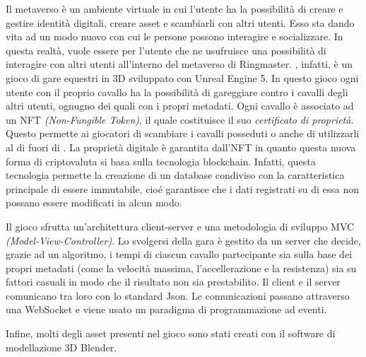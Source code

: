Il metaverso \`e un ambiente virtuale in cui l'utente ha la possibilità di creare e gestire identità digitali, creare asset e scambiarli con altri utenti. Esso sta dando vita ad un modo nuovo con cui le persone possono interagire e socializzare.
%
In questa realtà, \nomeapp{} vuole essere per l'utente che ne usufruisce una possibilità di interagire con altri utenti all'interno del metaverso di Ringmaster.
%
\nomeapp{}, infatti, \`e un gioco di gare equestri in 3D sviluppato con Unreal Engine 5.
%
In questo gioco ogni utente con il proprio cavallo ha la possibilità di gareggiare contro i cavalli degli altri utenti, ognugno dei quali con i propri metadati. 
%
Ogni cavallo \`e associato ad un NFT \textit{(Non-Fungible Token)}, il quale costituisce il suo \textit{certificato di proprietà}. Questo permette ai giocatori di scambiare i cavalli posseduti o anche di utilizzarli al di fuori di \nomeapp{}.
%
La proprietà digitale \`e garantita dall'NFT in quanto questa nuova forma di criptovaluta si basa sulla tecnologia blockchain. Infatti, questa tecnologia permette la creazione di un database condiviso con la caratteristica principale di essere immutabile, cio\'e garantisce che i dati registrati su di essa non possano essere modificati in alcun modo. 

Il gioco sfrutta un'architettura client-server e una metodologia di sviluppo MVC \textit{(Model-View-Controller)}. 
%
Lo svolgersi della gara \`e gestito da un server che decide, grazie ad un algoritmo, i tempi di ciascun cavallo partecipante sia sulla base dei propri metadati (come la velocità massima, l'accellerazione e la resistenza) sia su fattori casuali in modo che il risultato non sia prestabilito.
%
Il client e il server comunicano tra loro con lo standard Json. Le comunicazioni passano attraverso una WebSocket e viene usato un paradigma di programmazione ad eventi.

Infine, molti degli asset presenti nel gioco sono stati creati con il software di modellazione 3D Blender.


